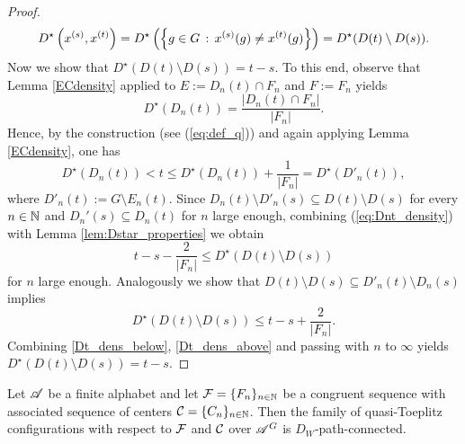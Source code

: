 \begin{proof}
\[
D^\star\left( x^{(s)}, x^{(t)}\right)=D^\star\left(\left\{g\in G\,:\,x^{(s)}(g)\neq x^{(t)}(g)\right\}\right) = D^\star(D(t)\setminus D(s)).
\]
Now we show that $D^\star(D(t)\setminus D(s)) = t-s$. To this end, observe that Lemma \ref{ECdensity} applied to $E:=D_n(t)\cap F_n$ and $F:=F_n$ yields
\[
D^\star(D_n(t))=\frac{|D_n(t)\cap F_n|}{|F_n|}.
\]
Hence, by the construction (see (\ref{eq:def_q})) and again applying Lemma \ref{ECdensity}, one has
\begin{equation}\label{eq:Dnt_density}
D^\star(D_n(t))<t \leq D^\star(D_n(t))+\frac{1}{|F_n|} = D^\star(D'_n(t)),
\end{equation}
where $D'_n(t) := G\setminus E_n(t)$. Since 
$D_n(t)\setminus D'_n(s)\subseteq D(t)\setminus D(s)$ for every $n\in \mathbb{N}$ and $D_n'(s)\subseteq D_n(t)$
for $n$ large enough,
combining (\ref{eq:Dnt_density}) with Lemma \ref{lem:Dstar_properties} we obtain 
\begin{equation}\label{Dt_dens_below}
t-s - \frac{2}{|F_n|} \leq D^\star(D(t)\setminus D(s)) 
\end{equation}
for $n$ large enough. Analogously we show that $D(t)\setminus D(s) \subseteq D'_n(t)\setminus D_n(s) $ implies 
\begin{equation}\label{Dt_dens_above}
D^\star(D(t)\setminus D(s)) \leq t-s +\frac{2}{|F_n|}.
\end{equation}
Combining \eqref{Dt_dens_below}, \eqref{Dt_dens_above} and passing with $n$ to $\infty$ yields $D^\star(D(t)\setminus D(s)) = t-s$.
\end{proof}


\begin{lem}\label{lem:connected2}
Let $\mathscr{A}$ be a finite alphabet and let $\operatorname{\mathcal{F}}=\{F_n\}_{n\in\mathbb{N}}$ be a congruent \Folner sequence with associated \elegant sequence of centers $\operatorname{\mathcal{C}}=\{C_n\}_{n\in\mathbb{N}}$.
Then the family of quasi-Toeplitz configurations with respect to  $\operatorname{\mathcal{F}}$ and $\operatorname{\mathcal{C}}$ over $\mathscr{A}^G$ is $D_W$-path-connected.
\end{lem}

